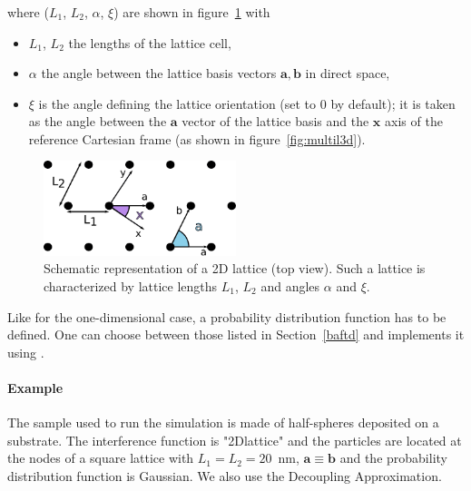 \FloatBarrier

\newpage
\subsubsection{} 
where ($L_1$, $L_2$, $\alpha$, $\xi$) are shown in figure~\ref{fig:2dlattice} with 
\begin{itemize}
\item[]$L_1$, $L_2$ the lengths of the lattice cell, 
\item[]$\alpha$ the angle between the lattice basis vectors $\mathbf{a}, \mathbf{b}$ in direct space,
\item[] $\xi$ is the angle defining the lattice orientation (set to $0$ by default); it is taken as the angle between the $\mathbf{a}$ vector of the lattice basis and the $\mathbf{x}$ axis of the reference Cartesian frame (as shown in figure~\ref{fig:multil3d}).
\end{itemize}

\begin{figure}[ht]
\begin{center}
\includegraphics[width=0.5\textwidth]{fig/drawing/2Dlattice.pdf}
\end{center}
\caption{Schematic representation of a 2D lattice (top view). Such a lattice is characterized by lattice lengths $L_1$, $L_2$ and angles $\alpha$ and $\xi$.}
\label{fig:2dlattice}
\end{figure}

Like for the one-dimensional case, a probability distribution function  has to be defined. One can choose between those listed in Section~\ref{baftd} and implements it using .

\paragraph{Example} The sample used to run the simulation is made of half-spheres deposited on a substrate. The interference function is "2Dlattice" and the particles are located at the nodes of a square lattice with $L_1=L_2=20$~nm, $\mathbf{a}\equiv \mathbf{b}$ and the probability distribution function is Gaussian. We also use the Decoupling Approximation. 


